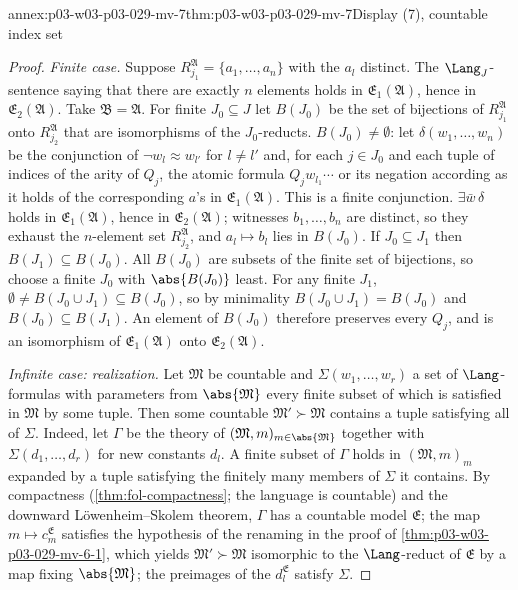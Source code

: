 \begin{annexitem}{annex:p03-w03-p03-029-mv-7}{thm:p03-w03-p03-029-mv-7}{Display (7), countable index set}
\begin{proof}
\emph{Finite case.} Suppose \(R_{j_1}^{\mathfrak A}=\{a_1,\ldots,a_n\}\)
with the \(a_l\) distinct. The \(\Lang_J\)-sentence saying that there are
exactly \(n\) elements holds in \(\mathfrak E_1(\mathfrak A)\), hence in
\(\mathfrak E_2(\mathfrak A)\). Take \(\mathfrak B=\mathfrak A\). For finite
\(J_0\subseteq J\) let \(B(J_0)\) be the set of bijections of
\(R_{j_1}^{\mathfrak A}\) onto \(R_{j_2}^{\mathfrak A}\) that are isomorphisms
of the \(J_0\)-reducts. \(B(J_0)\neq\emptyset\): let \(\delta(w_1,\ldots,w_n)\)
be the conjunction of \(\neg w_l\approx w_{l'}\) for \(l\neq l'\) and, for each
\(j\in J_0\) and each tuple of indices of the arity of \(Q_j\), the atomic
formula \(Q_j w_{l_1}\cdots\) or its negation according as it holds of the
corresponding \(a\)'s in \(\mathfrak E_1(\mathfrak A)\). This is a finite
conjunction. \(\exists\bar w\,\delta\) holds in \(\mathfrak E_1(\mathfrak
A)\), hence in \(\mathfrak E_2(\mathfrak A)\); witnesses \(b_1,\ldots,b_n\) are
distinct, so they exhaust the \(n\)-element set \(R_{j_2}^{\mathfrak A}\),
and \(a_l\mapsto b_l\) lies in \(B(J_0)\). If \(J_0\subseteq J_1\) then
\(B(J_1)\subseteq B(J_0)\). All \(B(J_0)\) are subsets of the finite set of
bijections, so choose a finite \(J_0\) with \(\abs{B(J_0)}\) least. For any
finite \(J_1\), \(\emptyset\neq B(J_0\cup J_1)\subseteq B(J_0)\), so by
minimality \(B(J_0\cup J_1)=B(J_0)\) and \(B(J_0)\subseteq B(J_1)\). An element
of \(B(J_0)\) therefore preserves every \(Q_j\), and is an isomorphism of
\(\mathfrak E_1(\mathfrak A)\) onto \(\mathfrak E_2(\mathfrak A)\).

\emph{Infinite case: realization.} Let \(\mathfrak M\) be countable and
\(\Sigma(w_1,\ldots,w_r)\) a set of \(\Lang\)-formulas with parameters from
\(\abs{\mathfrak M}\) every finite subset of which is satisfied in
\(\mathfrak M\) by some tuple. Then some countable \(\mathfrak
M'\succ\mathfrak M\) contains a tuple satisfying all of \(\Sigma\). Indeed,
let \(\Gamma\) be the theory of \((\mathfrak M,m)_{m\in\abs{\mathfrak M}}\)
together with \(\Sigma(d_1,\ldots,d_r)\) for new constants \(d_l\). A finite
subset of \(\Gamma\) holds in \((\mathfrak M,m)_m\) expanded by a tuple
satisfying the finitely many members of \(\Sigma\) it contains. By
compactness (\cref{thm:fol-compactness}; the language is countable) and the
downward L\"owenheim--Skolem theorem, \(\Gamma\) has a countable model
\(\mathfrak E\); the map \(m\mapsto c_m^{\mathfrak E}\) satisfies the
hypothesis of the renaming in the proof of \cref{thm:p03-w03-p03-029-mv-6-1},
which yields \(\mathfrak M'\succ\mathfrak M\) isomorphic to the
\(\Lang\)-reduct of \(\mathfrak E\) by a map fixing \(\abs{\mathfrak M}\); the
preimages of the \(d_l^{\mathfrak E}\) satisfy \(\Sigma\).


\end{proof}
\end{annexitem}
